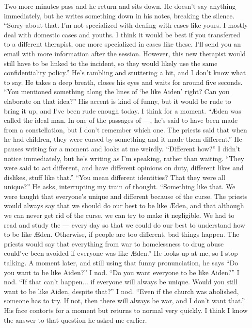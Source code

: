 \documentclass[a4paper, 12pt]{book}
\newcommand\tab[1][1cm]{\hspace*{#1}}
\newcommand\nextline{\newline\tab}
\begin{document}
\nextline
Two more minutes pass and he return and sits down. He doesn't say anything immediately, but he writes something down in his notes, breaking the silence. ``Sorry about that. I'm not specialized with dealing with cases like yours. I mostly deal with domestic cases and youths. I think it would be best if you transferred to a different therapist, one more specialized in cases like these. I'll send you an email with more information after the session. However, this new therapist would still have to be linked to the incident, so they would likely use the same confidentiality policy.'' He's rambling and stuttering a bit, and I don't know what to say. He takes a deep breath, closes his eyes and waits for around five seconds. ``You mentioned something along the lines of `be like Aiden' right? Can you elaborate on that idea?'' His accent is kind of funny, but it would be rude to bring it up, and I've been rude enough today.
\nextline
I think for a moment. ``Æden was called the ideal man. In one of the passages of ---, he's said to have been made from a constellation, but I don't remember which one. The priests said that when he had children, they were cursed by something and it made them different.''
\nextline
He pauses writing for a moment and looks at me weirdly. ``Different how?'' I didn't notice immediately, but he's writing as I'm speaking, rather than waiting.
\nextline
``They were said to act different, and have different opinions on duty, different likes and dislikes, stuff like that.''
\nextline
``You mean different identities? That they were all unique?'' He asks, interrupting my train of thought.
\nextline
``Something like that. We were taught that everyone's unique and different because of the curse. The priests would always say that we should do our best to be like Æden, and that although we can never get rid of the curse, we can try to make it negligible. We had to read and study the --- every day so that we could do our best to understand how to be like Æden. Otherwise, if people are too different, bad things happen. The priests would say that everything from war to homelessness to drug abuse could've been avoided if everyone was like Æden.'' He looks up at me, so I stop talking.
\nextline
A moment later, and still using that funny pronunciation, he says ``Do you want to be like Aiden?'' I nod. ``Do you want everyone to be like Aiden?'' I nod. ``If that can't happen... if everyone will always be unique. Would you still want to be like Aiden, despite that?'' I nod.
\nextline
``Even if the church was abolished, someone has to try. If not, then there will always be war, and I don't want that.'' His face contorts for a moment but returns to normal very quickly. I think I know the answer to that question he asked me earlier.
\end{document}
